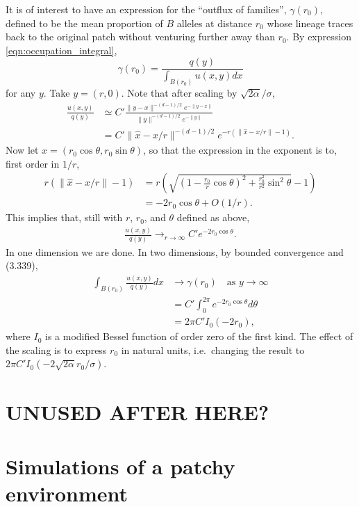 \documentclass{article}
\begin{document}
It is of interest to have an expression for the ``outflux of families'',
$\gamma(r_0)$, 
defined to be the mean proportion of $B$ alleles at distance $r_0$
whose lineage traces back to the original patch without venturing further away than $r_0$.
By expression \eqref{eqn:occupation_integral},
\[
    \gamma(r_0) = \frac{q(y)}{\int_{B(r_0)} u(x,y) dx}
\]
for any $y$.  
Take $y=(r,0)$.
Note that after scaling by $\sqrt{2\alpha}/\sigma$,
\begin{align}
    \frac{ u(x,y) }{ q(y) } &\simeq C' \frac{ \|y-x\|^{-(d-1)/2} e^{-\|y-x\|} }{ \|y\|^{-(d-1)/2} e^{-\|y\|} } \\
        &= C' \| \hat x - x/r \|^{-(d-1)/2} e^{-r (\|\hat x - x/r\| - 1)} .
\end{align}
Now let $x = (r_0 \cos \theta, r_0 \sin \theta)$,
so that the expression in the exponent is to, first order in $1/r$,
\begin{align}
    r (\|\hat x - x/r\| - 1) &= r \left( \sqrt{ \left( 1 - \frac{r_0}{r} \cos \theta \right)^2 + \frac{r_0^2}{r^2} \sin^2 \theta } - 1 \right ) \\
            &= - 2 r_0 \cos \theta + O(1/r) .
\end{align}
This implies that, still with $r$, $r_0$, and $\theta$ defined as above,
\begin{align}
    \frac{u(x,y)}{q(y)} \longrightarrow_{r \to \infty} C' e^{-2 r_0 \cos \theta} .
\end{align}
In one dimension we are done.
In two dimensions,
by bounded convergence and \citet{gradshteyn2007table} (3.339),
\begin{align}
  \int_{B(r_0)} \frac{u(x,y)}{q(y)} dx &\to \gamma(r_0) \quad \text{as } y \to \infty\\
            &= C' \int_0^{2 \pi} e^{-2 r_0 \cos \theta} d\theta \\
                         &= 2 \pi C' I_0(-2r_0),
\end{align}
where $I_0$ is a modified Bessel function of order zero of the first kind.
The effect of the scaling is to express $r_0$ in natural units, i.e.\ changing the result to $2 \pi C' I_0( - 2 \sqrt{2\alpha} r_0 / \sigma ) $.

\section{UNUSED AFTER HERE?}

\section{Simulations of a patchy environment}
\label{apx:patchy_sims}
\end{document}
